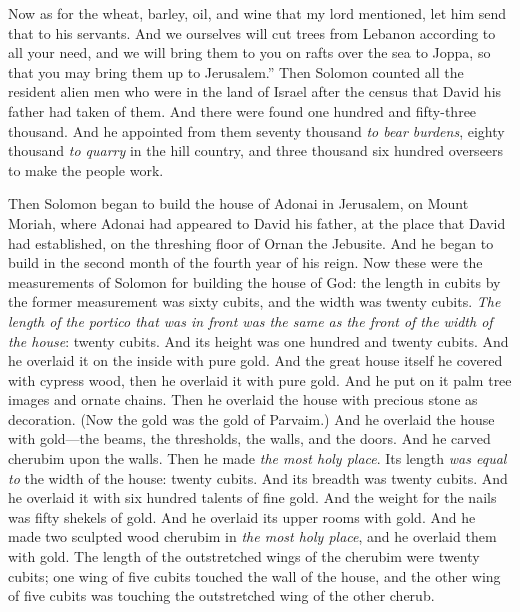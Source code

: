 \begin{biblechapter}
\verse Now as for the wheat, barley, oil, and wine that my lord mentioned, let him send that to his servants.
\verse And we ourselves will cut trees from Lebanon according to all your need, and we will bring them to you on rafts over the sea to Joppa, so that you may bring them up to Jerusalem.”
\verse Then Solomon counted all the resident alien men who were in the land of Israel after the census that David his father had taken of them. And there were found one hundred and fifty-three thousand.
\verse And he appointed from them seventy thousand \textit{to bear burdens}, eighty thousand \textit{to quarry} in the hill country, and three thousand six hundred overseers to make the people work.
\end{biblechapter}

\begin{biblechapter} %
 Then Solomon began to build the house of Adonai in Jerusalem, on Mount Moriah, where Adonai had appeared to David his father, at the place that David had established, on the threshing floor of Ornan the Jebusite.
\verse And he began to build in the second month of the fourth year of his reign.
\verse Now these were the measurements of Solomon for building the house of God: the length in cubits by the former measurement was sixty cubits, and the width was twenty cubits.
\verse \textit{The length of the portico that was in front was the same as the front of the width of the house}: twenty cubits. And its height was one hundred and twenty cubits. And he overlaid it on the inside with pure gold.
\verse And the great house itself he covered with cypress wood, then he overlaid it with pure gold. And he put on it palm tree images and ornate chains.
\verse Then he overlaid the house with precious stone as decoration. (Now the gold was the gold of Parvaim.)
\verse And he overlaid the house with gold—the beams, the thresholds, the walls, and the doors. And he carved cherubim upon the walls.
\verse Then he made \textit{the most holy place}. Its length \textit{was equal to} the width of the house: twenty cubits. And its breadth was twenty cubits. And he overlaid it with six hundred talents of fine gold.
\verse And the weight for the nails was fifty shekels of gold. And he overlaid its upper rooms with gold.
\verse And he made two sculpted wood cherubim in \textit{the most holy place}, and he overlaid them with gold.
\verse The length of the outstretched wings of the cherubim were twenty cubits; one wing of five cubits touched the wall of the house, and the other wing of five cubits was touching the outstretched wing of the other cherub.

\end{biblechapter}
